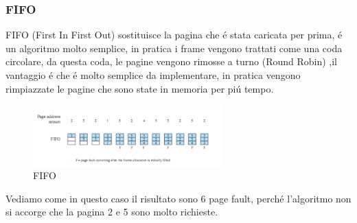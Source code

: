     \subsubsection*{FIFO}
    FIFO (First In First Out) sostituisce la pagina che é stata caricata per prima, é un algoritmo molto semplice,
    in pratica i frame vengono trattati come una coda circolare, da questa coda, le pagine vengono rimosse a turno (Round Robin)
    ,il vantaggio é che é molto semplice da implementare, in pratica vengono rimpiazzate le pagine che sono state in memoria per
    piú tempo.
    \begin{figure}[H]
        \centering
        \includegraphics[width=0.65\textwidth]{immagini/AlgoritmoSostituzioneFIFO}
        \caption{FIFO}
    \end{figure}
    Vediamo come in questo caso il risultato sono 6 page fault, perché l'algoritmo non si accorge che la pagina 2 e 5
    sono molto richieste.
